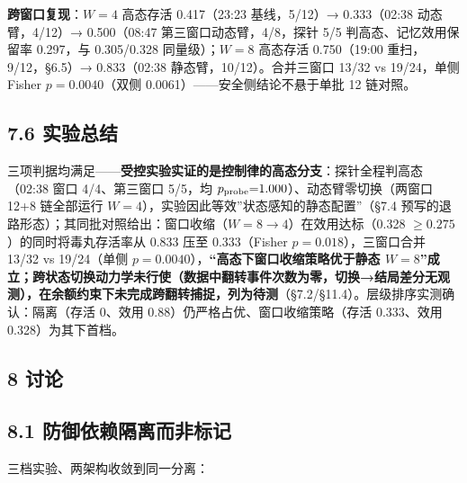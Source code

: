 \documentclass[
]{ctexart}
\begin{document}
\textbf{跨窗口复现}：\(W{=}4\) 高态存活 0.417（23:23 基线，5/12）→
0.333（02:38 动态臂，4/12）→ 0.500（08:47 第三窗口动态臂，4/8，探针 5/5
判高态、记忆效用保留率 0.297，与 0.305/0.328 同量级）；\(W{=}8\)
高态存活 0.750（19:00 重扫，9/12，§6.5）→ 0.833（02:38
静态臂，10/12）。合并三窗口 13/32 vs 19/24，单侧 Fisher
\(p{=}0.0040\)（双侧 0.0061）------安全侧结论不悬于单批 12 链对照。

\subsection{7.6 实验总结}\label{ux5b9eux9a8cux603bux7ed3}

三项判据均满足------\textbf{受控实验实证的是控制律的高态分支}：探针全程判高态（02:38
窗口 4/4、第三窗口 5/5，均
\(p_{\rm probe}{=}1.000\)）、动态臂零切换（两窗口 12+8 链全部运行
\(W{=}4\)），实验因此等效''状态感知的静态配置''（§7.4
预写的退路形态）；其同批对照给出：窗口收缩（\(W{=}8\to4\)）在效用达标（0.328
\(\ge0.275\)）的同时将毒丸存活率从 0.833 压至 0.333（Fisher
\(p{=}0.018\)），三窗口合并 13/32 vs 19/24（单侧
\(p{=}0.0040\)），\textbf{``高态下窗口收缩策略优于静态
\(W{=}8\)''成立；跨状态切换动力学未行使（数据中翻转事件次数为零，切换→结局差分无观测），在余额约束下未完成跨翻转捕捉，列为待测}（§7.2/§11.4）。层级排序实测确认：隔离（存活
0、效用 0.88）仍严格占优、窗口收缩策略（存活 0.333、效用
0.328）为其下首档。

\subsection{8 讨论}\label{ux8ba8ux8bba}

\subsection{8.1
防御依赖隔离而非标记}\label{ux9632ux5fa1ux4f9dux8d56ux9694ux79bbux800cux975eux6807ux8bb0}

三档实验、两架构收敛到同一分离：
\end{document}
